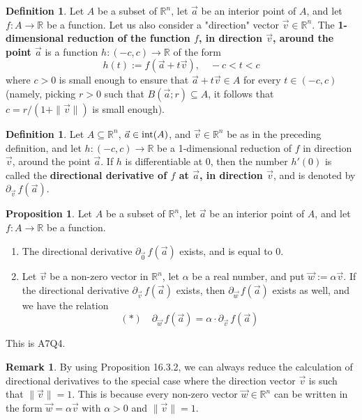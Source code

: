 \documentclass[11pt]{article}
\makeatletter
\theoremstyle{definition}
\newtheorem{defn}[thm]{Definition}
\newtheorem{prop}[thm]{Proposition}
\newtheorem{remark}[thm]{Remark}
\newcommand{\R}{\ensuremath{\mathbb{R}}}
\newenvironment{pf}[1][\proofname]{\par
  \pushQED{\qed}%
  \normalfont \topsep0\p@\relax
  \trivlist
  \item[\hskip\labelsep\itshape
  #1\@addpunct{.}]\ignorespaces
}{%
  \popQED\endtrivlist\@endpefalse
}
\makeatother
\begin{document}
\begin{defn}
Let $A$ be a subset of $\R^n$, let $\vec{a}$ be an interior point of $A$, and let $f : A \to \R$ be a function. Let us also consider a "direction" vector $\vec{v} \in \R^n$. The {\bf 1-dimensional reduction of the function $f$, in direction $\vec{v}$, around the point $\vec{a}$} is a function $h : (-c, c) \to \R$ of the form
$$h(t) := f(\vec{a} + t\vec{v}), \quad -c < t < c$$
where $c > 0$ is small enough to ensure that $\vec{a} + t\vec{v} \in A$ for every $t \in (-c, c)$ (namely, picking $r > 0$ such that $B(\vec{a}; r) \subseteq A$, it follows that $c = r / (1 + \|\vec{v}\|)$ is small enough).
\end{defn}

\begin{defn}
Let $A \subseteq \R^n$, $\vec{a} \in {\rm int}(A)$, and $\vec{v} \in \R^n$ be as in the preceding definition, and let $h : (-c, c) \to \R$ be a 1-dimensional reduction of $f$ in direction $\vec{v}$, around the point $\vec{a}$. If $h$ is differentiable at 0, then the number $h'(0)$ is called the {\bf directional derivative of $f$ at $\vec{a}$, in direction $\vec{v}$}, and is denoted by $\partial_{\vec{v}}\,f(\vec{a})$. 
\end{defn}

\begin{prop}
Let $A$ be a subset of $\R^n$, let $\vec{a}$ be an interior point of $A$, and let $f : A \to \R$ be a function.
\vspace{-1.5ex}\begin{enumerate}[(1)]
\item The directional derivative $\partial_{\vec{0}}\,f(\vec{a})$ exists, and is equal to 0.
\item Let $\vec{v}$ be a non-zero vector in $\R^n$, let $\alpha$ be a real number, and put $\vec{w} := \alpha\vec{v}$. If the directional derivative $\partial_{\vec{v}}\,f(\vec{a})$ exists, then $\partial_{\vec{w}}\,f(\vec{a})$ exists as well, and we have the relation
$$(*) \quad \partial_{\vec{w}}\,f(\vec{a}) = \alpha \cdot \partial_{\vec{v}}\,f(\vec{a})$$
\end{enumerate}\vspace{-1.5ex}
\begin{pf}
This is A7Q4.
\end{pf}
\end{prop}

\begin{remark}
By using Proposition 16.3.2, we can always reduce the calculation of directional derivatives to the special case where the direction vector $\vec{v}$ is such that $\|\vec{v}\| = 1$. This is because every non-zero vector $\vec{w} \in \R^n$ can be written in the form $\vec{w} = \alpha\vec{v}$ with $\alpha > 0$ and $\|\vec{v}\| = 1$.
\end{remark}
\end{document}
